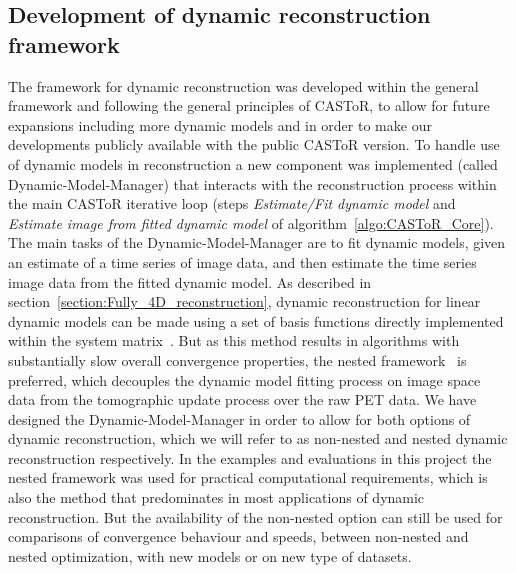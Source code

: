 \subsection{Development of dynamic reconstruction framework}
The framework for dynamic reconstruction was developed within the general framework and following the general principles of CASToR, to allow for future expansions including more dynamic models and in order to make our developments publicly available with the public CASToR version. 
To handle use of dynamic models in reconstruction a new component was implemented (called Dynamic-Model-Manager) that interacts with the reconstruction process within the main CASToR iterative loop (steps \textit{Estimate/Fit dynamic model} and \textit{Estimate image from fitted dynamic model} of algorithm~\ref{algo:CASToR_Core}). 
The main tasks of the Dynamic-Model-Manager are to fit dynamic models, given an estimate of a time series of image data, and then estimate the time series image data from the fitted dynamic model. 
As described in section~\ref{section:Fully_4D_reconstruction}, dynamic reconstruction for linear dynamic models can be made using a set of basis functions directly implemented within the system matrix~\cite{Matthews1995,Wang2008,Reader2014}. But as this method results in algorithms with substantially slow overall convergence properties, the nested framework~\cite{Wang2010,Matthews2010} is preferred, which decouples the dynamic model fitting process on image space data from the tomographic update process over the raw PET data.
We have designed the Dynamic-Model-Manager in order to allow for both options of dynamic reconstruction, which we will refer to as non-nested and nested dynamic reconstruction respectively. 
In the examples and evaluations in this project the nested framework was used for practical computational requirements, which is also the method that predominates in most applications of dynamic reconstruction. But the availability of the non-nested option can still be used for comparisons of convergence behaviour and speeds, between non-nested and nested optimization, with new models or on new type of datasets. 


